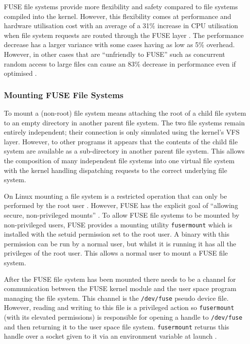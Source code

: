 FUSE file systems provide more flexibility and safety compared to file systems
compiled into the kernel. However, this flexibility comes at performance and
hardware utilisation cost with an average of a 31\% increase in CPU utilisation
when file system requests are routed through the FUSE layer \cite{fuse-perf}.
The performance decrease has a larger variance with some cases having as low as
5\% overhead. However, in other cases that are ``unfriendly to FUSE'' such as
concurrent random access to large files can cause an 83\% decrease in
performance even if optimised \cite{fuse-perf}.

\subsubsection{Mounting FUSE File Systems}
\label{mounting-fuse-fs}

To mount a (non-root) file system means attaching the root of a child file
system to an empty directory in another parent file system. The two file
systems remain entirely independent; their connection is only simulated using
the kernel's VFS layer. However, to other programs it appears that the contents
of the child file system are available as a sub-directory in another parent
file system. This allows the composition of many independent file systems into
one virtual file system with the kernel handling dispatching requests to the
correct underlying file system.

On Linux mounting a file system is a restricted operation that can only be
performed by the root user \cite{mount}. However, FUSE has the explicit goal of
``allowing secure, non-privileged mounts'' \cite{kernel-fuse}. To allow FUSE
file systems to be mounted by non-privileged users, FUSE provides a mounting
utility \texttt{fusermount} which is installed with the setuid \cite{setuid}
permission set to the root user. A binary with this permission can be run by a
normal user, but whilst it is running it has all the privileges of the root
user. This allows a normal user to mount a FUSE file system.

After the FUSE file system has been mounted there needs to be a channel for
communication between the FUSE kernel module and the user space program
managing the file system. This channel is the \texttt{/dev/fuse} pseudo device
file. However, reading and writing to this file is a privileged action so
\texttt{fusermount} (with its elevated permissions) is responsible for opening
a handle to \texttt{/dev/fuse} and then returning it to the user space file
system. \texttt{fusermount} returns this handle over a socket given to it via
an environment variable at launch \cite{fuser-mounting-code}.

